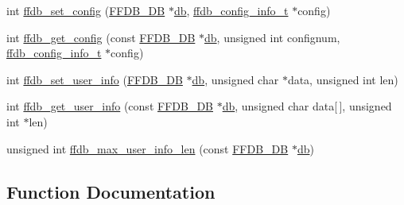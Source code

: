 \begin{DoxyCompactItemize}
\item 
int \mbox{\hyperlink{adat-devel_2other__libs_2filedb_2filehash_2ffdb__hash_8c_ae36e14bba7052f0de66a7b5d1308f9ba}{ffdb\+\_\+set\+\_\+config}} (\mbox{\hyperlink{adat-devel_2other__libs_2filedb_2filehash_2ffdb__db_8h_a0b27b956926453a7a8141ea8e10f0df8}{F\+F\+D\+B\+\_\+\+DB}} $\ast$\mbox{\hyperlink{structdb}{db}}, \mbox{\hyperlink{adat-devel_2other__libs_2filedb_2filehash_2ffdb__db_8h_acc961fbd2faf6a849a1620309100fda1}{ffdb\+\_\+config\+\_\+info\+\_\+t}} $\ast$config)
\item 
int \mbox{\hyperlink{adat-devel_2other__libs_2filedb_2filehash_2ffdb__hash_8c_a02bc33564d34e6fe08e28f3bad609cfb}{ffdb\+\_\+get\+\_\+config}} (const \mbox{\hyperlink{adat-devel_2other__libs_2filedb_2filehash_2ffdb__db_8h_a0b27b956926453a7a8141ea8e10f0df8}{F\+F\+D\+B\+\_\+\+DB}} $\ast$\mbox{\hyperlink{structdb}{db}}, unsigned int confignum, \mbox{\hyperlink{adat-devel_2other__libs_2filedb_2filehash_2ffdb__db_8h_acc961fbd2faf6a849a1620309100fda1}{ffdb\+\_\+config\+\_\+info\+\_\+t}} $\ast$config)
\item 
int \mbox{\hyperlink{adat-devel_2other__libs_2filedb_2filehash_2ffdb__hash_8c_aa9be22f501b0567050accbc8c9026c11}{ffdb\+\_\+set\+\_\+user\+\_\+info}} (\mbox{\hyperlink{adat-devel_2other__libs_2filedb_2filehash_2ffdb__db_8h_a0b27b956926453a7a8141ea8e10f0df8}{F\+F\+D\+B\+\_\+\+DB}} $\ast$\mbox{\hyperlink{structdb}{db}}, unsigned char $\ast$data, unsigned int len)
\item 
int \mbox{\hyperlink{adat-devel_2other__libs_2filedb_2filehash_2ffdb__hash_8c_a92fefe6ca23ce778c0d595a7d93a3689}{ffdb\+\_\+get\+\_\+user\+\_\+info}} (const \mbox{\hyperlink{adat-devel_2other__libs_2filedb_2filehash_2ffdb__db_8h_a0b27b956926453a7a8141ea8e10f0df8}{F\+F\+D\+B\+\_\+\+DB}} $\ast$\mbox{\hyperlink{structdb}{db}}, unsigned char data\mbox{[}$\,$\mbox{]}, unsigned int $\ast$len)
\item 
unsigned int \mbox{\hyperlink{adat-devel_2other__libs_2filedb_2filehash_2ffdb__hash_8c_ae8a9ae9edc3fe45e5e342d0fabcc56e9}{ffdb\+\_\+max\+\_\+user\+\_\+info\+\_\+len}} (const \mbox{\hyperlink{adat-devel_2other__libs_2filedb_2filehash_2ffdb__db_8h_a0b27b956926453a7a8141ea8e10f0df8}{F\+F\+D\+B\+\_\+\+DB}} $\ast$\mbox{\hyperlink{structdb}{db}})
\end{DoxyCompactItemize}


\subsection{Function Documentation}
\mbox{\label{adat-devel_2other__libs_2filedb_2filehash_2ffdb__hash_8c_ae249c66e95687ce85bfd206872a6e64e}} 
